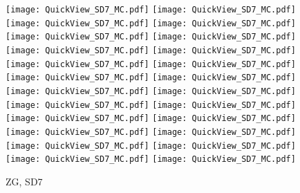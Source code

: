 \documentclass[amsmath,amssymb,aps,floatfix]{revtex4-1}
\begin{document}
\begin{figure}
   \centering
   \texttt{[image: QuickView\_SD7\_MC.pdf]}
   \texttt{[image: QuickView\_SD7\_MC.pdf]}
   \texttt{[image: QuickView\_SD7\_MC.pdf]}
   \texttt{[image: QuickView\_SD7\_MC.pdf]}\\
   \texttt{[image: QuickView\_SD7\_MC.pdf]}
   \texttt{[image: QuickView\_SD7\_MC.pdf]}
   \texttt{[image: QuickView\_SD7\_MC.pdf]}
   \texttt{[image: QuickView\_SD7\_MC.pdf]}\\
   \texttt{[image: QuickView\_SD7\_MC.pdf]}
   \texttt{[image: QuickView\_SD7\_MC.pdf]}
   \texttt{[image: QuickView\_SD7\_MC.pdf]}
   \texttt{[image: QuickView\_SD7\_MC.pdf]}\\
   \texttt{[image: QuickView\_SD7\_MC.pdf]}
   \texttt{[image: QuickView\_SD7\_MC.pdf]}
   \texttt{[image: QuickView\_SD7\_MC.pdf]}
   \texttt{[image: QuickView\_SD7\_MC.pdf]}\\
   \texttt{[image: QuickView\_SD7\_MC.pdf]}
   \texttt{[image: QuickView\_SD7\_MC.pdf]}
   \texttt{[image: QuickView\_SD7\_MC.pdf]}
   \texttt{[image: QuickView\_SD7\_MC.pdf]}\\
   \texttt{[image: QuickView\_SD7\_MC.pdf]}
   \texttt{[image: QuickView\_SD7\_MC.pdf]}
   \texttt{[image: QuickView\_SD7\_MC.pdf]}
   \texttt{[image: QuickView\_SD7\_MC.pdf]}\\
   \caption{ZG, SD7}
   \label{Figure:SD7Result}
\end{figure}
\end{document}

